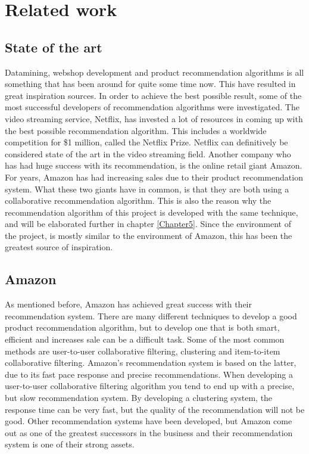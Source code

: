 
\chapter{Related work} %

\label{Chapter3} %


\section{State of the art}

Datamining, webshop development and product recommendation algorithms is all something that has been around for quite some time now. This have resulted in great inspiration sources. In order to achieve the best possible result, some of the most successful developers of recommendation algorithms were investigated. The video streaming service, Netflix, has invested a lot of resources in coming up with the best possible recommendation algorithm.\cite{Netflix} This includes a worldwide competition for \$1 million, called the Netflix Prize. \cite{NetflixPrize} Netflix can definitively be considered state of the art in the video streaming field. Another company who has had huge success with its recommendation, is the online retail giant Amazon. For years, Amazon has had increasing sales due to their product recommendation system.\cite{AmazonSuccess} What these two giants have in common, is that they are both using a collaborative recommendation algorithm. This is also the reason why the recommendation algorithm of this project is developed with the same technique, and will be elaborated further in chapter \ref{Chapter5}. Since the environment of the project, is mostly similar to the environment of Amazon, this has been the greatest source of inspiration. 


\section{Amazon}
As mentioned before, Amazon has achieved great success with their recommendation system. There are many different techniques to develop a good product recommendation algorithm, but to develop one that is both smart, efficient and increases sale can be a difficult task. Some of the most common methods are user-to-user collaborative filtering, clustering and item-to-item collaborative filtering. Amazon's recommendation system is based on the latter, due to its fast pace response and precise recommendations. When developing a user-to-user collaborative filtering algorithm you tend to end up with a precise, but slow recommendation system. By developing a clustering system, the response time can be very fast, but the quality of the recommendation will not be good. \cite{AmazonRecommendations} Other recommendation systems have been developed, but Amazon come out as one of the greatest successors in the business and their recommendation system is one of their strong assets.

